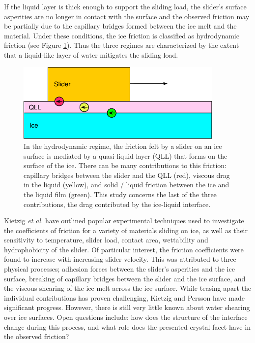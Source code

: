 If the liquid layer is thick enough to support the sliding load, the
slider's surface asperities are no longer in contact with the surface
and the observed friction may be partially due to the capillary
bridges formed between the ice melt and the material. Under these
conditions, the ice friction is classified as hydrodynamic friction
(see Figure \ref{fig:QLLsketch}).\cite{Kietzig2009,Kietzig2010} Thus
the three regimes are characterized by the extent that a liquid-like
layer of water mitigates the sliding load.

\begin{figure}
\includegraphics[width=4in]{Figures/QLLsketch}
\caption{\label{fig:QLLsketch} In the hydrodynamic regime, the
  friction felt by a slider on an ice surface is mediated by a
  quasi-liquid layer (QLL) that forms on the surface of the ice.
  There can be many contributions to this friction: capillary bridges
  between the slider and the QLL (red), viscous drag in the liquid
  (yellow), and solid / liquid friction between the ice and the liquid
  film (green). This study concerns the last of the three
  contributions, the drag contributed by the ice-liquid interface.}
\end{figure}

Kietzig \textit{et al.} have outlined popular experimental techniques
used to investigate the coefficients of friction for a variety of
materials sliding on ice, as well as their sensitivity to temperature,
slider load, contact area, wettability and hydrophobicity of the
slider.\cite{Kietzig2010} Of particular interest, the friction
coefficients were found to increase with increasing slider
velocity. This was attributed to three physical processes; adhesion
forces between the slider's asperities and the ice surface, breaking
of capillary bridges between the slider and the ice surface, and the
viscous shearing of the ice melt across the ice surface. While teasing
apart the individual contributions has proven challenging,
Kietzig\cite{Kietzig2009} and Persson\cite{Persson2015,Tuononen2016}
have made significant progress. However, there is still very little
known about water shearing over ice surfaces. Open questions include:
how does the structure of the interface change during this process,
and what role does the presented crystal facet have in the observed
friction?


